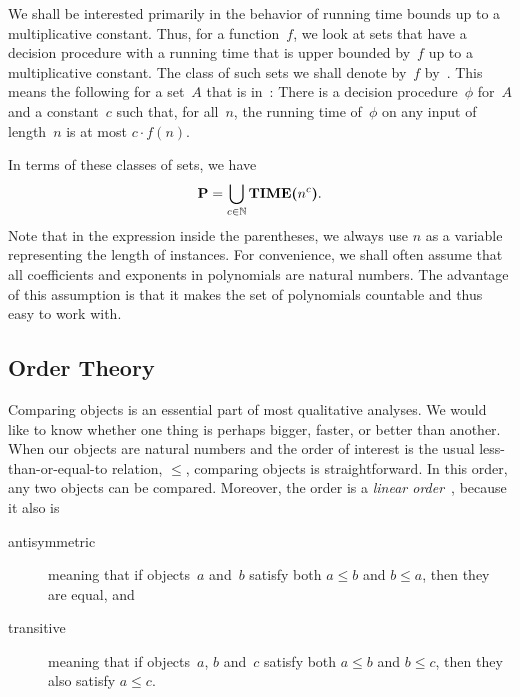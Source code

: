 We shall be interested primarily in the behavior of running time bounds up to a multiplicative constant.
Thus, for a function~$f$, we look at sets that have a decision procedure with a running time that is upper bounded by~$f$ up to a multiplicative constant.
The class of such sets we shall denote by~$f$ by~.
This means the following for a set~$A$ that is in~:
There is a decision procedure~$\phi$ for~$A$ and a constant~$c$ such that, for all~$n$, the running time of~$\phi$ on any input of length~$n$ is at most $c \cdot f(n)$.

In terms of these classes of sets, we have
\begin{equation*}
  \textnormal{\textbf{P}} = \bigcup_{c \in \mathbb{N}} \textnormal{\textbf{TIME($n^c$)}}.
\end{equation*}
Note that in the expression inside the parentheses, we always use $n$ as a variable representing the length of instances.
For convenience, we shall often assume that all coefficients and exponents in polynomials are natural numbers.
The advantage of this assumption is that it makes the set of polynomials countable and thus easy to work with.


\subsection{Order Theory}

Comparing objects is an essential part of most qualitative analyses.
We would like to know whether one thing is perhaps bigger, faster, or better than another.
When our objects are natural numbers and the order of interest is the usual less-than-or-equal-to relation, $\le$, comparing objects is straightforward.
In this order, any two objects can be compared.
Moreover, the order is a \emph{linear order}~\parencite{davey2002introduction}, because it also is
\begin{description}
\item[antisymmetric] meaning that if objects~$a$ and~$b$ satisfy both $a \le b$ and $b \le a$, then they are equal, and
\item[transitive] meaning that if objects~$a$, $b$ and~$c$ satisfy both $a \le b$ and $b \le c$, then they also satisfy $a \le c$.
\end{description}

